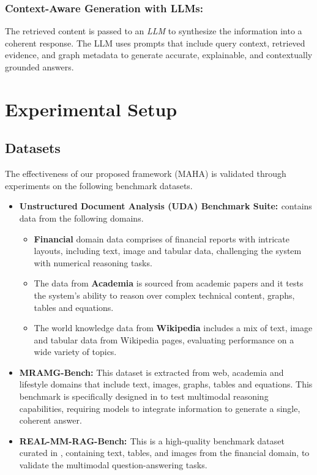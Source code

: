 \documentclass{svproc}
\begin{document}
\subsubsection{Context-Aware Generation with LLMs:}
The retrieved content is passed to an \textit{LLM} to synthesize the information into a coherent response. The LLM uses prompts that include query context, retrieved evidence, and graph metadata to generate accurate, explainable, and contextually grounded answers.



\section{Experimental Setup}
\subsection{Datasets}
The effectiveness of our proposed framework (MAHA) is validated through experiments on the following benchmark datasets.
\begin{itemize}
\item \textbf{Unstructured Document Analysis (UDA) Benchmark Suite:
\cite{UDA}}
contains data from the following domains.
\begin{itemize}
\item \textbf{Financial} domain data comprises of financial reports with intricate layouts, including text, image and tabular data, challenging the system with numerical reasoning tasks.
\item The data from \textbf{Academia} is sourced from academic papers and it tests the system's ability to reason over complex technical content, graphs, tables and equations.
\item The world knowledge data from \textbf{Wikipedia} includes a mix of text, image and tabular data from Wikipedia pages, evaluating performance on a wide variety of topics.
\end{itemize}
\item \textbf{MRAMG-Bench:\cite{mram}} This dataset is extracted from web, academia and lifestyle domains that include text, images, graphs, tables and equations. This benchmark is specifically designed in \cite{mram} to test multimodal reasoning capabilities, requiring models to integrate information to generate a single, coherent answer.
\item \textbf{REAL-MM-RAG-Bench: \cite{Real-MM-RG}} This is a high-quality
benchmark dataset curated in \cite{Real-MM-RG}, containing text, tables, and images from the financial domain, to validate the multimodal question-answering tasks.
\end{itemize}
\end{document}
